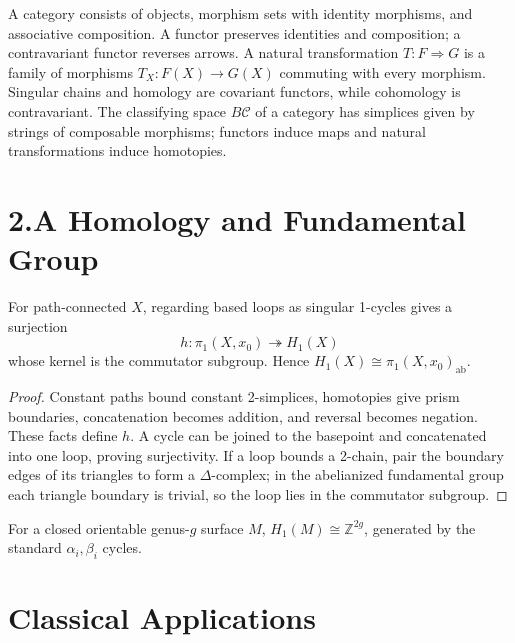 A category consists of objects, morphism sets with identity morphisms, and associative composition.  A functor preserves identities and composition; a contravariant functor reverses arrows.  A natural transformation $T:F\Rightarrow G$ is a family of morphisms $T_X:F(X)\to G(X)$ commuting with every morphism.  Singular chains and homology are covariant functors, while cohomology is contravariant.  The classifying space $B\mathcal C$ of a category has simplices given by strings of composable morphisms; functors induce maps and natural transformations induce homotopies.

\section{2.A Homology and Fundamental Group}

\begin{theorem}
\label{thm:hurewicz-dimension-1}

For path-connected $X$, regarding based loops as singular 1-cycles gives a surjection
\[
h:\pi_1(X,x_0)\twoheadrightarrow H_1(X)
\]
whose kernel is the commutator subgroup.  Hence $H_1(X)\cong\pi_1(X,x_0)_{\mathrm{ab}}$.
\end{theorem}
\begin{proof}
\sketch Constant paths bound constant 2-simplices, homotopies give prism boundaries, concatenation becomes addition, and reversal becomes negation.  These facts define $h$.  A cycle can be joined to the basepoint and concatenated into one loop, proving surjectivity.  If a loop bounds a 2-chain, pair the boundary edges of its triangles to form a $\Delta$-complex; in the abelianized fundamental group each triangle boundary is trivial, so the loop lies in the commutator subgroup.
\end{proof}

\begin{example}
\label{ex:h1-closed-orientable-surface}

For a closed orientable genus-$g$ surface $M$, $H_1(M)\cong\mathbb{Z}^{2g}$, generated by the standard $\alpha_i,\beta_i$ cycles.
\end{example}

\section{Classical Applications}

